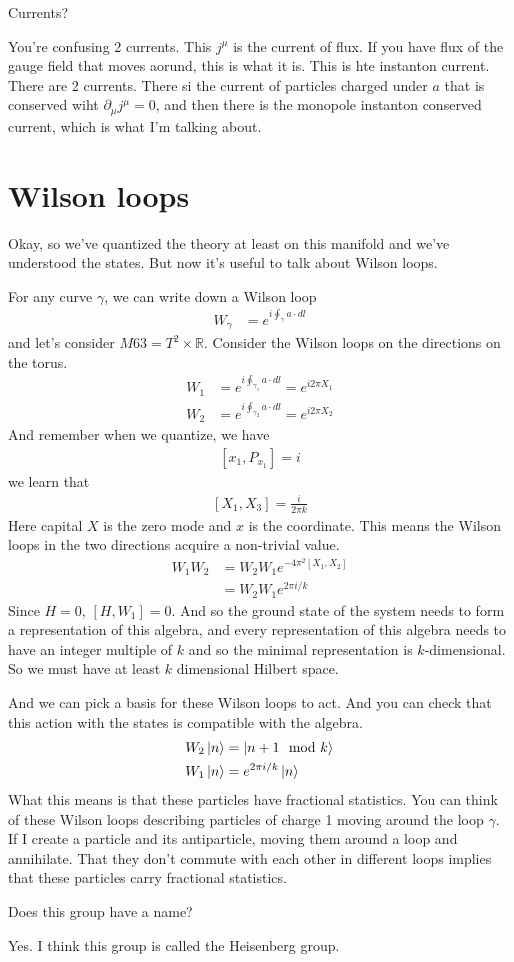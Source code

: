 \begin{question}
    Currents?
\end{question}
You're confusing 2 currents.
This $j^\mu$ is the current of flux.
If you have flux of the gauge field that moves aorund,
this is what it is.
This is hte instanton current.
There are 2 currents.
There si the current of particles charged under $a$ that is conserved wiht
$\partial_\mu j^\mu=0$,
and then there is the monopole instanton conserved current,
which is what I'm talking about.

\section{Wilson loops}
Okay,
so we've quantized the theory at least on this manifold
and we've understood the states.
But now it's useful to talk about Wilson loops.

For any curve $\gamma$,
we can write down a Wilson loop
\begin{align}
    W_\gamma &=
    e^{i\oint_\gamma a\cdot dl}
\end{align}
and let's consider $M63 = T^2\times \mathbb{R}$.
Consider the Wilson loops on the directions on the torus.
\begin{align}
    W_1 &=
    e^{i\oint_{\gamma_1} a\cdot dl} = e^{i 2\pi X_1}\\
    W_2 &=
    e^{i\oint_{\gamma_2} a\cdot dl} = e^{i 2\pi X_2}
\end{align}
And remember when we quantize,
we have
\begin{align}
    \left[ x_1, P_{x_1} \right] = i
\end{align}
we learn that
\begin{align}
    \left[ X_1, X_3 \right] = \frac{i}{2\pi k}
\end{align}
Here capital $X$ is the zero mode and $x$ is the coordinate.
This means the Wilson loops in the two directions acquire a non-trivial value.
\begin{align}
    W_1 W_2 &=
    W_2 W_1 e^{-4\pi^2\left[ X_1, X_2 \right]}\\
    &= W_2 W_1 e^{2\pi i/k}
\end{align}
Since $H=0$, $[H,W_1]=0$.
And so the ground state of the system needs to form a representation of this
algebra,
and every representation of this algebra needs to have an integer multiple of
$k$ and so the minimal representation is $k$-dimensional.
So we must have at least $k$ dimensional Hilbert space.

And we can pick a basis for these Wilson loops to act.
And you can check that this action with the states is compatible with the
algebra.
\begin{align}
    W_2\ket{n} &=
    \ket{n + 1 \mod k}\\
    W_1 \ket{n} &=
    e^{2\pi i/k}\ket{n}
\end{align}
What this means is that these particles have fractional statistics.
You can think of these Wilson loops describing particles of charge 1 moving
around the loop $\gamma$.
If I create a particle and its antiparticle,
moving them around a loop and annihilate.
That they don't commute with each other in different loops implies that these
particles carry fractional statistics.

\begin{question}
    Does this group have a name?
\end{question}
Yes. I think this group is called the Heisenberg group.
